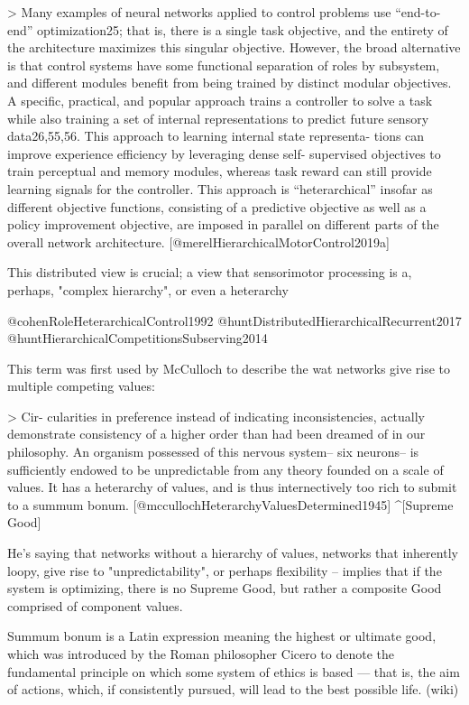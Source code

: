 \documentclass[../main.tex]{subfiles}
\begin{document}
{{> Many examples of neural networks applied to control problems use “end-to-end” optimization25; that is, there is a single task objective, and the entirety of the architecture maximizes this singular objective. However, the broad alternative is that control systems have some functional separation of roles by subsystem, and different modules benefit from being trained by distinct modular objectives. A specific, practical, and popular approach trains a controller to solve a task while also training a set of internal representations to predict future sensory data26,55,56. This approach to learning internal state representa- tions can improve experience efficiency by leveraging dense self- supervised objectives to train perceptual and memory modules, whereas task reward can still provide learning signals for the controller. This approach is “heterarchical” insofar as different objective functions, consisting of a predictive objective as well as a policy improvement objective, are imposed in parallel on different parts of the overall network architecture. [@merelHierarchicalMotorControl2019a]


 This distributed view is crucial; a view that sensorimotor processing is a, perhaps, "complex hierarchy", or even a heterarchy

@cohenRoleHeterarchicalControl1992
@huntDistributedHierarchicalRecurrent2017
@huntHierarchicalCompetitionsSubserving2014

This term was first used by McCulloch to describe the wat networks give rise to multiple competing values:

> Cir- cularities in preference instead of indicating inconsistencies, actually demonstrate consistency of a higher order than had been dreamed of in our philosophy. An organism possessed of this nervous system-- six neurons-- is sufficiently endowed to be unpredictable from any theory founded on a scale of values. It has a heterarchy of values, and is thus internectively too rich to submit to a summum bonum. [@mccullochHeterarchyValuesDetermined1945] ^[Supreme Good] 

He's saying that networks without a hierarchy of values, networks that inherently loopy, give rise to "unpredictability", or perhaps flexibility -- implies that if the system is optimizing, there is no Supreme Good, but rather a composite Good comprised of component values.

Summum bonum is a Latin expression meaning the highest or ultimate good, which was introduced by the Roman philosopher Cicero to denote the fundamental principle on which some system of ethics is based — that is, the aim of actions, which, if consistently pursued, will lead to the best possible life. (wiki)

}}
\end{document}
